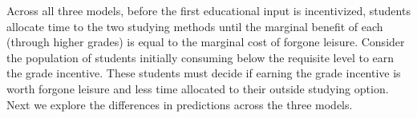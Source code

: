 \documentclass[12pt]{article}
\begin{document}
Across all three models, before the first educational input is incentivized, students allocate time to the two studying methods until the marginal benefit of each (through higher grades) is equal to the marginal cost of forgone leisure. Consider the population of students initially consuming below the requisite level to earn the grade incentive. These students must decide if earning the grade incentive is worth forgone leisure and less time allocated to their outside studying option. Next we explore the differences in predictions across the three models.



\end{document}
